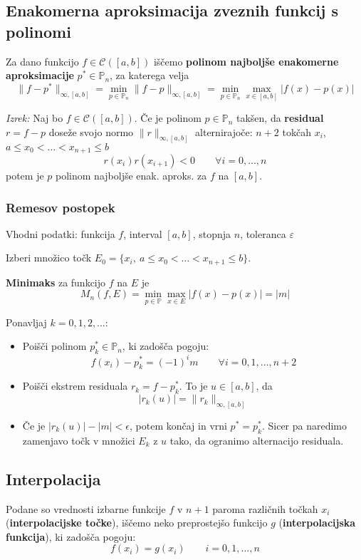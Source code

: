 \begin{multicols}{5}
\subsection*{Enakomerna aproksimacija zveznih funkcij s polinomi}
Za dano funkcijo $f \in \mathcal{C}([a,b])$ iščemo \textbf{polinom najboljše enakomerne aproksimacije} $p^* \in \mathbb{P}_n$, za katerega velja
\[ \| f - p^* \|_{\infty, [a,b]} = \min_{p \in \mathbb{P}_n} \| f - p\|_{\infty, [a,b]} = \min_{p \in \mathbb{P}_n} \max_{x \in [a, b]} | f(x) - p(x) | \]

\textit{Izrek:} Naj bo $f \in \mathcal{C}([a, b])$. Če je polinom $p \in \mathbb{P}_n$ takšen,
da \textbf{residual} $r = f - p$ doseže svojo normo $\| r \|_{\infty, [a,b]}$ alternirajoče:
$n+2$ tokčah $x_i$, $a \leq x_0 < \dots < x_{n+1} \leq b$ 
\[ r(x_i)r(x_{i+1}) < 0 \qquad \forall i=0, \dots, n \]
potem je $p$ polinom najboljše enak. aproks. za $f$ na $[a, b]$.

\subsubsection*{Remesov postopek}
Vhodni podatki: funkcija $f$, interval $[a,b]$, stopnja $n$, toleranca $\varepsilon$

Izberi množico točk $E_0 = \{ x_i,\ a \leq x_0 < \dots < x_{n+1} \leq b \}$.

\textbf{Minimaks} za funkcijo $f$ na $E$ je
\[M_n(f, E) = \min_{p \in \mathbb{P}} \max_{x \in E} | f(x) - p(x) | = |m|\]

Ponavljaj $k = 0, 1, 2, \dots$:
\begin{itemize}
    \item Poišči polinom $p_k^* \in \mathbb{P}_n$, ki zadošča pogoju:
    \[ f(x_i) - p_k^* = (-1)^i m \qquad \forall i = 0, 1, \dots, n+2 \]
    \item Poišči ekstrem residuala $r_k = f - p_k^*$. To je $u \in [a,b]$, da
    \[ |r_k(u)| = \| r_k \|_{\infty, [a,b]} \]
    \item Če je $|r_k(u)| - |m| < \epsilon$, potem končaj in vrni $p^* = p_k^*$. 
    Sicer pa naredimo zamenjavo točk v množici $E_k$ z $u$ tako, da ogranimo alternacijo residuala.
\end{itemize}

\subsection*{Interpolacija}
Podane so vrednosti izbarne funkcije $f$ v $n+1$ paroma različnih točkah $x_i$ (\textbf{interpolacijske točke}),
iščemo neko preprostejšo funkcijo $g$ (\textbf{interpolacijska funkcija}), ki zadošča pogoju:
\[ f(x_i) = g(x_i) \qquad i = 0, 1, \dots, n \]


\end{multicols}
